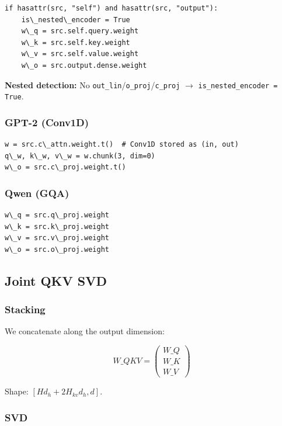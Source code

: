 \begin{lstlisting}
if hasattr(src, "self") and hasattr(src, "output"):
    is\_nested\_encoder = True
    w\_q = src.self.query.weight
    w\_k = src.self.key.weight
    w\_v = src.self.value.weight
    w\_o = src.output.dense.weight
\end{lstlisting}

\textbf{Nested detection:} No \texttt{out\_lin}/\texttt{o\_proj}/\texttt{c\_proj} $\to$ \texttt{is\_nested\_encoder = True}.

\subsubsection{GPT-2 (Conv1D)}

\begin{lstlisting}
w = src.c\_attn.weight.t()  # Conv1D stored as (in, out)
q\_w, k\_w, v\_w = w.chunk(3, dim=0)
w\_o = src.c\_proj.weight.t()
\end{lstlisting}

\subsubsection{Qwen (GQA)}

\begin{lstlisting}
w\_q = src.q\_proj.weight
w\_k = src.k\_proj.weight
w\_v = src.v\_proj.weight
w\_o = src.o\_proj.weight
\end{lstlisting}

\subsection{Joint QKV SVD}

\subsubsection{Stacking}

We concatenate along the output dimension:

\[
W\_{QKV} = \begin{pmatrix} W\_Q \\ W\_K \\ W\_V \end{pmatrix}
\]

Shape: $[H d_h + 2 H_{kv} d_h, d]$.

\subsubsection{SVD}

